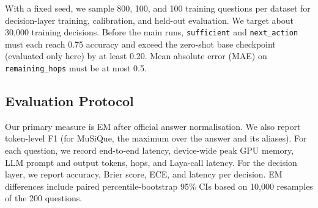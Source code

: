 With a fixed seed, we sample 800, 100, and 100 training questions per dataset for
decision-layer training, calibration, and held-out evaluation. We target about
30{,}000 training decisions. Before the main runs, \texttt{sufficient} and
\texttt{next\_action} must each reach 0.75 accuracy and exceed the zero-shot base
checkpoint (evaluated only here) by at least 0.20. Mean absolute error (MAE) on
\texttt{remaining\_hops} must be at most 0.5.

\subsection{Evaluation Protocol}
\label{sec:method:eval}

Our primary measure is EM after official answer normalisation. We also report token-level
F1 (for MuSiQue, the maximum over the answer and its aliases). For each question, we record
end-to-end latency, device-wide peak GPU memory, LLM prompt and output tokens, hops, and
Laya-call latency. For the decision layer, we report accuracy, Brier score, ECE, and
latency per decision. EM differences include paired percentile-bootstrap 95\% CIs based
on 10{,}000 resamples of the 200 questions.


